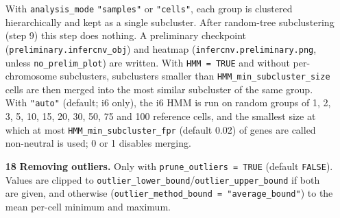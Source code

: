 \begin{enumerate}
With \texttt{analysis\_mode} \texttt{"samples"} or \texttt{"cells"}, each group is clustered hierarchically and kept as a single subcluster. After random-tree subclustering (step 9) this step does nothing. A preliminary checkpoint (\texttt{preliminary.infercnv\_obj}) and heatmap (\texttt{infercnv.preliminary.png}, unless \texttt{no\_prelim\_plot}) are written. With \texttt{HMM\ =\ TRUE} and without per-chromosome subclusters, subclusters smaller than \texttt{HMM\_min\_subcluster\_size} cells are then merged into the most similar subcluster of the same group. With \texttt{"auto"} (default; i6 only), the i6 HMM is run on random groups of 1, 2, 3, 5, 10, 15, 20, 30, 50, 75 and 100 reference cells, and the smallest size at which at most \texttt{HMM\_min\_subcluster\_fpr} (default 0.02) of genes are called non-neutral is used; 0 or 1 disables merging.

\item[\textbf{18}] \textbf{Removing outliers.} Only with \texttt{prune\_outliers\ =\ TRUE} (default \texttt{FALSE}). Values are clipped to \texttt{outlier\_lower\_bound}/\texttt{outlier\_upper\_bound} if both are given, and otherwise (\texttt{outlier\_method\_bound\ =\ "average\_bound"}) to the mean per-cell minimum and maximum.


\end{enumerate}
